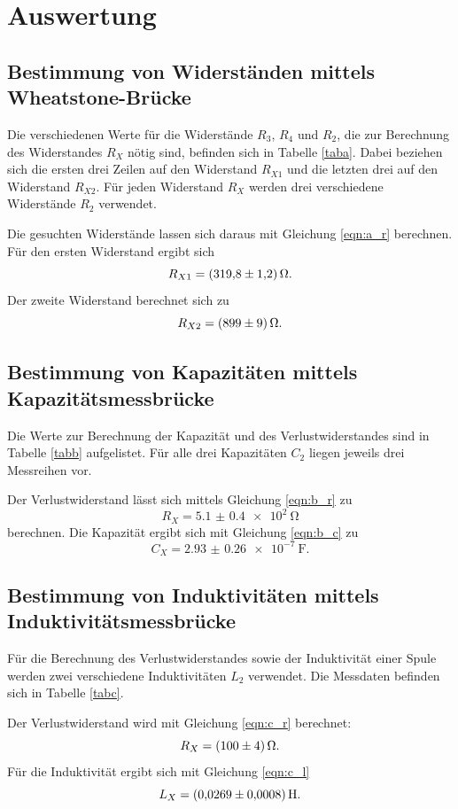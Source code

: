 \section{Auswertung}
\label{sec:Auswertung}

\subsection{Bestimmung von Widerständen mittels Wheatstone-Brücke}
Die verschiedenen Werte für die Widerstände $R_3$, $R_4$ und $R_2$, die zur Berechnung des Widerstandes $R_X$
nötig sind, befinden sich in Tabelle \ref{taba}. Dabei beziehen sich die ersten drei Zeilen auf den Widerstand
$R_{X1}$ und die letzten drei auf den Widerstand $R_{X2}$. Für jeden Widerstand $R_X$ werden drei verschiedene
Widerstände $R_2$ verwendet.

\noindent Die gesuchten Widerstände lassen sich daraus mit Gleichung \eqref{eqn:a_r} berechnen.
Für den ersten Widerstand ergibt sich
\begin{equation*}
    R_{X1} = \SI{319.8 \pm 1.2}{\ohm}.
\end{equation*}
Der zweite Widerstand berechnet sich zu
\begin{equation*}
    R_{X2} = \SI{899 \pm 9}{\ohm}.
\end{equation*}

\subsection{Bestimmung von Kapazitäten mittels Kapazitätsmessbrücke}
Die Werte zur Berechnung der Kapazität und des Verlustwiderstandes sind in Tabelle \ref{tabb} aufgelistet.
Für alle drei Kapazitäten $C_2$ liegen jeweils drei Messreihen vor.

\noindent Der Verlustwiderstand lässt sich mittels Gleichung \eqref{eqn:b_r} zu
\begin{equation*}
    R_X = \SI{5.1(04)e2}{\ohm}
\end{equation*}
berechnen.
Die Kapazität ergibt sich mit Gleichung \eqref{eqn:b_c} zu
\begin{equation*}
    C_X = \SI{2.93(026)e-7}{\farad}.
\end{equation*}

\subsection{Bestimmung von Induktivitäten mittels Induktivitätsmessbrücke}
Für die Berechnung des Verlustwiderstandes sowie der Induktivität einer Spule werden zwei verschiedene
Induktivitäten $L_2$ verwendet. Die Messdaten befinden sich in Tabelle \ref{tabc}.

\noindent Der Verlustwiderstand wird mit Gleichung \eqref{eqn:c_r} berechnet:
\begin{equation*}
    R_X = \SI{100 \pm 4}{\ohm}.
\end{equation*}
Für die Induktivität ergibt sich mit Gleichung \eqref{eqn:c_l}
\begin{equation*}
    L_X = \SI{0.0269 \pm 0.0008}{\henry}.
\end{equation*}

